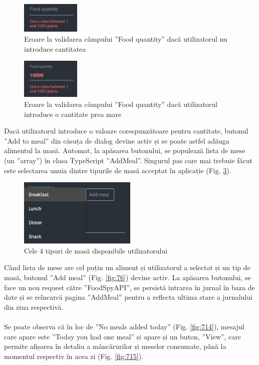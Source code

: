 \begin{figure}[!htb]
	\centering
	\includegraphics[width=0.25\textwidth]
	{../LaTeX/Images/App/add_edit-error.PNG}
	\caption{Eroare la validarea câmpului ”Food quantity” dacă utilizatorul nu introduce cantitatea}
	\label{fig:711}
\end{figure}

\begin{figure}[!htb]
	\centering
	\includegraphics[width=0.25\textwidth]
	{../LaTeX/Images/App/add_edit-error-10000.PNG}
	\caption{Eroare la validarea câmpului ”Food quantity” dacă utilizatorul introduce o cantitate prea mare}
	\label{fig:712}
\end{figure}

Dacă utilizatorul introduce o valoare corespunzătoare pentru cantitate, butonul ”Add to meal” din căsuța de dialog devine activ și se poate astfel adăuga alimentul la masă. Automat, la apăsarea butonului, se populează lista de mese (un ”array”) în clasa TypeScript ”AddMeal”. Singurul pas care mai trebuie făcut este selectarea unuia dintre tipurile de masă acceptat în aplicație (Fig. \ref{fig:713}).

\begin{figure}[!htb]
	\centering
	\includegraphics[width=0.5\textwidth]
	{../LaTeX/Images/App/add_meal-type.PNG}
	\caption{Cele 4 tipuri de masă disponibile utilizatorului}
	\label{fig:713}
\end{figure}

Când lista de mese are cel puțin un aliment și utilizatorul a selectat și un tip de masă, butonul ”Add meal” (Fig. \ref{fig:76}) devine activ. La apăsarea butonului, se face un nou request către ”FoodSpyAPI”, se persistă intrarea în jurnal în baza de date și se reîncarcă pagina ”AddMeal” pentru a reflecta ultima stare a jurnalului din ziua respectivă.
\\ \\
Se poate observa că în loc de ”No meals added today” (Fig. \ref{fig:714}), mesajul care apare este ”Today you had one meal” și apare și un buton, ”View”, care permite afișarea în detaliu a mâncărurilor și meselor consumate, până la momentul respectiv în acea zi (Fig. \ref{fig:715}).


